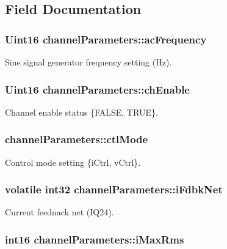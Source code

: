\subsection{Field Documentation}
\hypertarget{structchannel_parameters_a817bac18060f842dca3867eeb7e2d06c}{
\subsubsection[{ac\-Frequency}]{\setlength{\rightskip}{0pt plus 5cm}Uint16 channel\-Parameters\-::ac\-Frequency}}\label{structchannel_parameters_a817bac18060f842dca3867eeb7e2d06c}
Sine signal generator frequency setting (Hz). \hypertarget{structchannel_parameters_af99576e00746544eab1d4e88d12f39b4}{
\subsubsection[{ch\-Enable}]{\setlength{\rightskip}{0pt plus 5cm}Uint16 channel\-Parameters\-::ch\-Enable}}\label{structchannel_parameters_af99576e00746544eab1d4e88d12f39b4}
Channel enable status \{F\-A\-L\-S\-E, T\-R\-U\-E\}. \hypertarget{structchannel_parameters_ab31dab8e873272dd15641943b20e56a5}{
\subsubsection[{ctl\-Mode}]{ channel\-Parameters\-::ctl\-Mode}}\label{structchannel_parameters_ab31dab8e873272dd15641943b20e56a5}
Control mode setting \{i\-Ctrl, v\-Ctrl\}. \hypertarget{structchannel_parameters_ad4f53b220d97af172b01f1a6d57a9635}{
\subsubsection[{i\-Fdbk\-Net}]{\setlength{\rightskip}{0pt plus 5cm}volatile int32 channel\-Parameters\-::i\-Fdbk\-Net}}\label{structchannel_parameters_ad4f53b220d97af172b01f1a6d57a9635}
Current feednack net (I\-Q24). \hypertarget{structchannel_parameters_ab4b8dda9d3ab4395a3fde8bc0e403212}{
\subsubsection[{i\-Max\-Rms}]{\setlength{\rightskip}{0pt plus 5cm}int16 channel\-Parameters\-::i\-Max\-Rms}}\label{structchannel_parameters_ab4b8dda9d3ab4395a3fde8bc0e403212}
